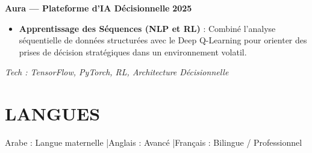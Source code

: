 \documentclass[a4paper,12pt]{article}
\begin{document}
\noindent\textbf{\large Aura — Plateforme d'IA Décisionnelle} \hfill \textbf{2025}
\vspace{2pt}
{\small
\begin{itemize}
    \item \textbf{Apprentissage des Séquences (NLP et RL)} : Combiné l'analyse séquentielle de données structurées avec le Deep Q-Learning pour orienter des prises de décision stratégiques dans un environnement volatil.
\end{itemize}
\textit{Tech : TensorFlow, PyTorch, RL, Architecture Décisionnelle}
}
\vspace{12pt}

\section{LANGUES}
Arabe : Langue maternelle \quad|\quad Anglais : Avancé \quad|\quad Français : Bilingue / Professionnel
\end{document}
